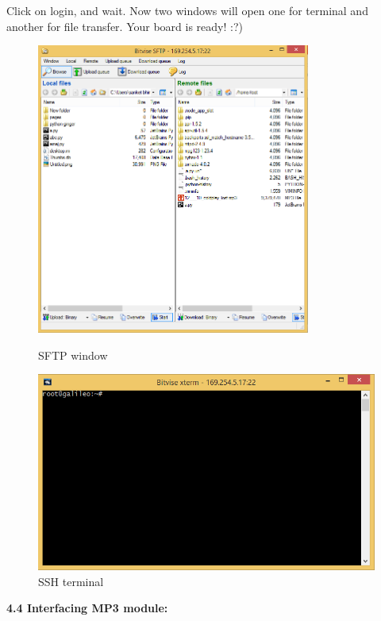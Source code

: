 \documentclass[11pt,a4paper]{article}
\begin{document}
Click on login, and wait. Now two windows will open one for terminal and another for file transfer.
Your board is ready! :?)
\begin{figure}
  \includegraphics[width=9cm]{5.png}
  \caption{SFTP window}
    \includegraphics[width=\linewidth]{6.png}
  \caption{SSH terminal}
\end{figure}

	\newpage
     
	\textbf{\huge{4.4 Interfacing MP3 module:}}
	\vspace{1cm}\\
\end{document}
